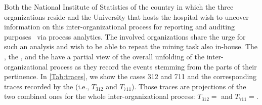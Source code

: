 Both the National Institute of Statistics of the country in which the three organizations reside and the University that hosts the hospital wish to uncover information on this inter-organizational process for reporting and auditing purposes~\citep{Jans.Hosseinpour/IJAIS2019:ActiveLearningProcessMiningForAuditing} via process analytics. The involved organizations share the urge for such an analysis and wish to be able to repeat the mining task also in-house. 
The , the , and the  have a partial view of the overall unfolding of the inter-organizational process as they record the events stemming from the parts of their pertinence. %
In \cref{Tab:traces}, we show the cases 312 and 711 and the corresponding traces recorded by the  (i.e., $T_{312}$ and $T_{711}$). %
Those traces are projections of the two combined ones for the whole inter-organizational process: $T_{312}=$\textlangle{}{\TaliceUncolored}\textrangle{} and $T_{711}=$\textlangle{}{\TbobUncolored}\textrangle{}. %
